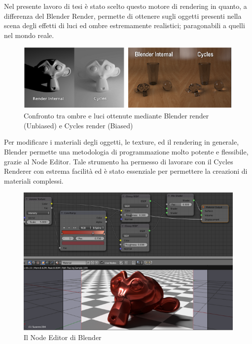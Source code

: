 Nel presente lavoro di tesi è stato scelto questo motore di rendering in quanto, a differenza del Blender Render, permette di ottenere sugli oggetti presenti nella scena degli effetti di luci ed ombre estremamente realistici; paragonabili a quelli nel mondo reale.
\begin{figure}[htb]
 \centering
 \includegraphics[width=0.9\linewidth]{images/chapter_tecnologie_abilitanti/tecnologie_abilitanti_bias_unbias.png}\hfill
 \caption[Cycles render e Blender render]{Confronto tra ombre e luci ottenute mediante Blender render (Unbiased) e Cycles render (Biased)}
 \label{fig:tecnologie_abilitanti_bias_unbias}
\end{figure}
Per modificare i materiali degli oggetti, le texture, ed il rendering in generale, Blender permette una metodologia di programmazione molto potente e flessibile, grazie al Node Editor. Tale strumento ha permesso di lavorare con il Cycles Renderer con estrema facilità ed è stato essenziale per permettere la creazioni di materiali complessi. \cite{node_editor1,node_editor3}
\\
\begin{figure}[htb]
 \centering
 \includegraphics[width=1\linewidth]{images/chapter_tecnologie_abilitanti/tecnologie_abilitanti_node_editor.png}\hfill
 \caption[Blender Node Editor]{Il Node Editor di Blender}
 \label{fig:tecnologie_abilitanti_node_editor}
\end{figure}
